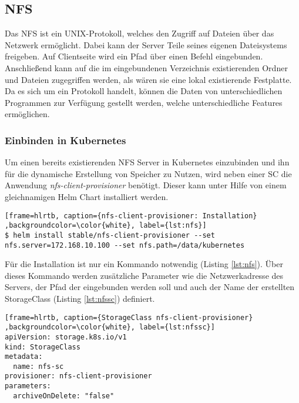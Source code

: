 \subsection{NFS}
Das \ac{NFS} ist ein UNIX-Protokoll, welches den Zugriff auf Dateien über das Netzwerk ermöglicht. Dabei kann der Server Teile seines eigenen Dateisystems freigeben. Auf Clientseite wird ein Pfad über einen Befehl eingebunden. Anschließend kann auf die im eingebundenen Verzeichnis existierenden Ordner und Dateien zugegriffen werden, als wären sie eine lokal existierende Festplatte. Da es sich um ein Protokoll handelt, können die Daten von unterschiedlichen Programmen zur Verfügung gestellt werden, welche unterschiedliche Features ermöglichen.

\subsubsection{Einbinden in Kubernetes}
\label{eva:nfskube}
Um einen bereits existierenden NFS Server in Kubernetes einzubinden und ihn für die dynamische Erstellung von Speicher zu Nutzen, wird neben einer \ac{SC} die Anwendung \textit{nfs-client-provisioner} benötigt. Dieser kann unter Hilfe von einem gleichnamigen Helm Chart installiert werden.
\lstset{language=bash}
\begin{lstlisting}[frame=hlrtb, caption={nfs-client-provisioner: Installation} ,backgroundcolor=\color{white}, label={lst:nfs}]
$ helm install stable/nfs-client-provisioner --set nfs.server=172.168.10.100 --set nfs.path=/data/kubernetes
\end{lstlisting}
Für die Installation ist nur ein Kommando notwendig (Listing \ref{lst:nfs}). Über dieses Kommando werden zusätzliche Parameter wie die Netzwerkadresse des Servers, der Pfad der eingebunden werden soll und auch der Name der erstellten StorageClass (Listing \ref{lst:nfssc}) definiert.
\lstset{language=yaml}
\begin{lstlisting}[frame=hlrtb, caption={StorageClass nfs-client-provisioner} ,backgroundcolor=\color{white}, label={lst:nfssc}]
apiVersion: storage.k8s.io/v1
kind: StorageClass
metadata:
  name: nfs-sc
provisioner: nfs-client-provisioner
parameters:
  archiveOnDelete: "false"
\end{lstlisting}

